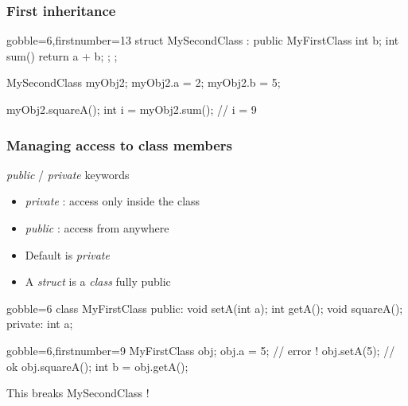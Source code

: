 \begin{frame}[fragile]
  \frametitle{First inheritance}
  \begin{multicols}{2}
    \begin{cppcode*}{gobble=6,firstnumber=13}
      struct MySecondClass :
        public MyFirstClass {
        int b;
        int sum() {
          return a + b;
        };
      };

      MySecondClass myObj2;
      myObj2.a = 2;
      myObj2.b = 5;

      myObj2.squareA();
      int i = myObj2.sum();
      // i = 9
    \end{cppcode*}
    \columnbreak
    \center
    \null \vfill
    \vfill \null
  \end{multicols}
\end{frame}

\begin{frame}[fragile]
  \frametitle{Managing access to class members}
  \begin{block}{{\it public} / {\it private} keywords}
    \begin{itemize}
      \item {\it private} : access only inside the class
      \item {\it public} : access from anywhere
      \item Default is {\it private}
      \item A {\it struct} is a {\it class} fully public
    \end{itemize}
  \end{block}
  \pause
  \begin{multicols}{2}
    \begin{cppcode*}{gobble=6}
      class MyFirstClass {
      public:
        void setA(int a);
        int getA();
        void squareA();
      private:
        int a;
      }
    \end{cppcode*}
    \columnbreak
    \begin{cppcode*}{gobble=6,firstnumber=9}
      MyFirstClass obj;
      obj.a = 5;   // error !
      obj.setA(5); // ok
      obj.squareA();
      int b = obj.getA();
    \end{cppcode*}
    \pause
    \begin{tcolorbox}[left=0mm,right=0mm,top=0mm,bottom=0mm,colback=red!5!white,colframe=red!75!black]
      This breaks MySecondClass !
    \end{tcolorbox}
  \end{multicols}
\end{frame}

